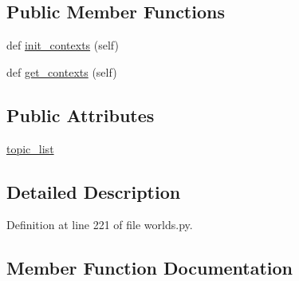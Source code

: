\subsection*{Public Member Functions}
\begin{DoxyCompactItemize}
\item 
def \hyperlink{classparlai_1_1tasks_1_1wizard__of__wikipedia_1_1worlds_1_1InteractiveSelfchatWorld_a7c8bb5adb1d2d5a94852dd205457dc6b}{init\+\_\+contexts} (self)
\item 
def \hyperlink{classparlai_1_1tasks_1_1wizard__of__wikipedia_1_1worlds_1_1InteractiveSelfchatWorld_ac2a96e3d645041e1e03add8c5cc7ed60}{get\+\_\+contexts} (self)
\end{DoxyCompactItemize}
\subsection*{Public Attributes}
\begin{DoxyCompactItemize}
\item 
\hyperlink{classparlai_1_1tasks_1_1wizard__of__wikipedia_1_1worlds_1_1InteractiveSelfchatWorld_a50745d66f073be01963f68411a94a06b}{topic\+\_\+list}
\end{DoxyCompactItemize}


\subsection{Detailed Description}


Definition at line 221 of file worlds.\+py.



\subsection{Member Function Documentation}
\mbox{\label{classparlai_1_1tasks_1_1wizard__of__wikipedia_1_1worlds_1_1InteractiveSelfchatWorld_ac2a96e3d645041e1e03add8c5cc7ed60}} 

